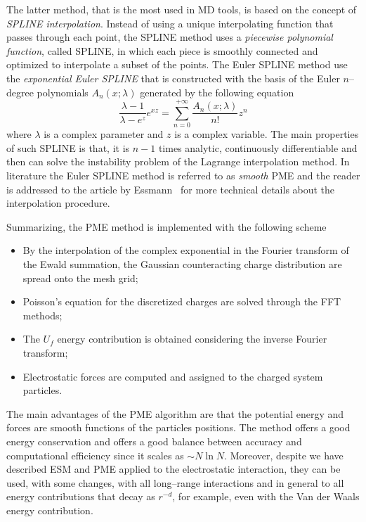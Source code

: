 The latter method, that is the most used in \ac{MD} tools, is based on the concept of \textit{SPLINE
interpolation}. Instead of using a unique interpolating function that passes through each point, the SPLINE
method uses a \textit{piecewise polynomial function}, called SPLINE, in which each piece is smoothly connected
and optimized to interpolate a subset of the points. The Euler SPLINE method use the \textit{exponential Euler
SPLINE} that is constructed with the basis of the Euler $n$--degree polynomials $A_n(x;\lambda)$ generated by the
following equation
\begin{equation*}
	\frac{\lambda - 1}{\lambda - e^z}e^{xz} = \sum_{n=0}^{+\infty} \frac{A_n(x;\lambda)}{n!}z^n
\end{equation*}
where $\lambda$ is a complex parameter and $z$ is a complex variable. The main properties of such SPLINE is that,
it is $n-1$ times analytic, continuously differentiable and then can solve the instability problem of the
Lagrange interpolation method. In literature the Euler SPLINE method is referred to as \textit{smooth} \ac{PME}
and the reader is addressed to the article by Essmann \etal\, \cite{EssmannSPME} for more technical details about
the interpolation procedure.

Summarizing, the \ac{PME} method is implemented with the following scheme
\begin{itemize}
	\item By the interpolation of the complex exponential in the Fourier transform of the Ewald summation, the
		  Gaussian counteracting charge distribution are spread onto the mesh grid;
	\item Poisson's equation for the discretized charges are solved through the \ac{FFT} methods;
	\item The $U_f$ energy contribution is obtained considering the inverse Fourier transform;
	\item Electrostatic forces are computed and assigned to the charged system particles.
\end{itemize}

The main advantages of the \ac{PME} algorithm are that the potential energy and forces are smooth functions of
the particles positions. The method offers a good energy conservation and offers a good balance between accuracy
and computational efficiency since it scales as $\sim N\ln N$. Moreover, despite we have described \ac{ESM} and
\ac{PME} applied to the electrostatic interaction, they can be used, with some changes, with all long--range
interactions and in general to all energy contributions that decay as $r^{-d}$, for example, even with the Van
der Waals energy contribution.

